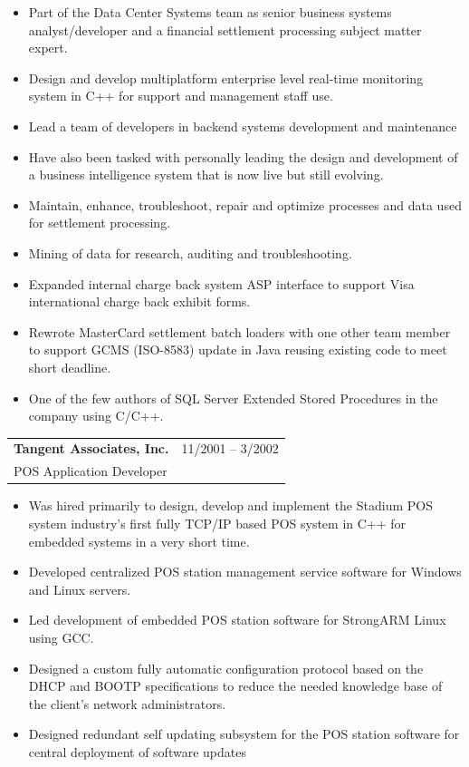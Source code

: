 \documentclass[10pt]{report}
\begin{document}
\begin{itemize}
\item Part of the Data Center Systems team as senior business systems analyst/developer and a financial settlement processing subject matter expert.  
\item Design and develop multiplatform enterprise level real-time monitoring system in C++ for support and management staff use. 
\item Lead a team of developers in backend systems development and maintenance
\item Have also been tasked with personally leading the design and development of a business intelligence system that is now live but still evolving.
\item Maintain, enhance, troubleshoot, repair and optimize processes and data used for settlement processing.
\item Mining of data for research, auditing and troubleshooting.
\item Expanded internal charge back system ASP interface to support Visa international charge back exhibit forms.
\item Rewrote MasterCard settlement batch loaders with one other team member to support GCMS (ISO-8583) update in Java reusing existing code to meet short deadline.
\item One of the few authors of SQL Server Extended Stored Procedures in the company using C/C++.
\end{itemize}
\bigskip

\noindent
\begin{tabular}{ L{.5\textwidth}  R{.4\textwidth} }
\textbf{\large Tangent Associates, Inc.} & 11/2001 -- 3/2002 \\
POS Application Developer
\end{tabular}

\begin{itemize}
\item Was hired primarily to design, develop and implement the Stadium POS system industry’s first fully TCP/IP based POS system in C++ for embedded systems in a very short time.
\item Developed centralized POS station management service software for Windows and Linux servers.
\item Led development of embedded POS station software for StrongARM Linux using GCC.
\item Designed a custom fully automatic configuration protocol based on the DHCP and BOOTP specifications to reduce the needed knowledge base of the client’s network administrators.
\item Designed redundant self updating subsystem for the POS station software for central deployment of software updates
\end{itemize}
\bigskip
\end{document}
